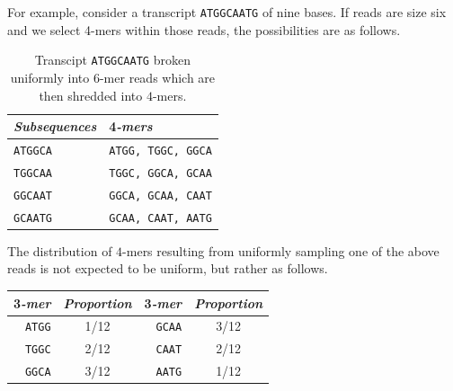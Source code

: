\documentclass[11pt]{article}
\newcommand{\rob}[1]{\todo[inline]{\textbf{Robert: }#1}}
\begin{document}
For example, consider a transcript \texttt{ATGGCAATG} of nine bases.
If reads are size six and we select 4-mers within those reads,
the possibilities are as follows.
\begin{table}[h!]
\centering
  \begin{tabular}{l|l}
    \textit{Subsequences} & 4\textit{-mers}
    \\ \hline \hline
    \texttt{ATGGCA} & \texttt{ATGG, TGGC, GGCA}
    \\ \hline
    \texttt{\hspace{0.5em}TGGCAA} & \texttt{\hspace{3em}TGGC, GGCA, GCAA}
    \\ \hline
    \texttt{\hspace{1em}GGCAAT} & \texttt{\hspace{6em}GGCA, GCAA, CAAT}
    \\ \hline
    \texttt{\hspace{1.5em}GCAATG} & \texttt{\hspace{9em}GCAA, CAAT, AATG}
  \end{tabular}
  \caption{Transcipt \texttt{ATGGCAATG} broken uniformly into $6$-mer reads which are then shredded into $4$-mers.}
  \label{tab:reads}
\end{table}
The distribution of $4$-mers resulting from uniformly sampling one of the above reads
is not expected to be uniform, but rather as follows.
\begin{center}
  \begin{tabular}{r|c||r|c}
    3\textit{-mer} & \textit{Proportion} & 3\textit{-mer} & \textit{Proportion}
    \\ \hline \hline
    \texttt{ATGG} & 1/12 & \texttt{GCAA} & 3/12
    \\ \hline
    \texttt{TGGC} & 2/12 & \texttt{CAAT} & 2/12
    \\ \hline
    \texttt{GGCA} & 3/12 & \texttt{AATG} & 1/12
  \end{tabular}
\end{center}
\end{document}
